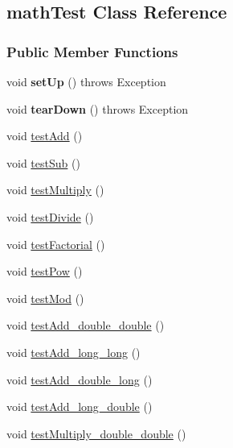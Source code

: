 \hypertarget{classmathTest}{}\subsection{math\+Test Class Reference}
\label{classmathTest}
\subsubsection*{Public Member Functions}
\begin{DoxyCompactItemize}
\item 
\mbox{\label{classmathTest_a60fffe6fb9bfd4854de1d55cff4ee59f}} 
void {\bfseries set\+Up} ()  throws Exception 
\item 
\mbox{\label{classmathTest_abf22d411eabb17b0fafa537b8c47901e}} 
void {\bfseries tear\+Down} ()  throws Exception 
\item 
void \hyperlink{classmathTest_a668450783db3595473dc34b7c31b6594}{test\+Add} ()
\item 
void \hyperlink{classmathTest_a11b3f5b6f8b8a05fdf31b1953b0affcd}{test\+Sub} ()
\item 
void \hyperlink{classmathTest_aa6165368ab983978a08e95d558532767}{test\+Multiply} ()
\item 
void \hyperlink{classmathTest_a8f0ef65453e1f02809813e508f71ec07}{test\+Divide} ()
\item 
void \hyperlink{classmathTest_acfb432a0a42c093d4ff07f6a2d217f70}{test\+Factorial} ()
\item 
void \hyperlink{classmathTest_a0716cccf36e4e0cbc81338f47068cfe9}{test\+Pow} ()
\item 
void \hyperlink{classmathTest_a9f61b4253c0fdb04a3ba7552703a8879}{test\+Mod} ()
\item 
void \hyperlink{classmathTest_a7b1a619e083f9a71b5a091cab2de3753}{test\+Add\+\_\+double\+\_\+double} ()
\item 
void \hyperlink{classmathTest_ab4ec2fd96a11cbee844a295518f0474d}{test\+Add\+\_\+long\+\_\+long} ()
\item 
void \hyperlink{classmathTest_a72ca573e76fbe7f9b2020991147a29d1}{test\+Add\+\_\+double\+\_\+long} ()
\item 
void \hyperlink{classmathTest_adb101b785ac541dce91f6de05cf0ed51}{test\+Add\+\_\+long\+\_\+double} ()
\item 
void \hyperlink{classmathTest_aa2b97494b8a746145ddf876c3a44b01d}{test\+Multiply\+\_\+double\+\_\+double} ()

\end{DoxyCompactItemize}
